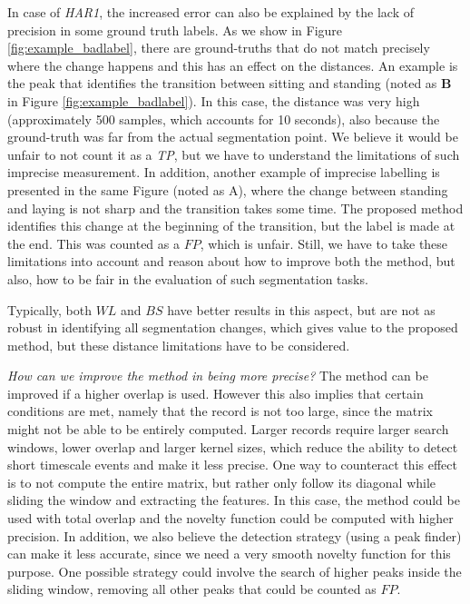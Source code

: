 In case of \textit{HAR1}, the increased error can also be explained by the lack of precision in some ground truth labels. As we show in Figure \ref{fig:example_badlabel}, there are ground-truths that do not match precisely where the change happens and this has an effect on the distances. An example is the peak that identifies the transition between sitting and standing (noted as \textbf{B} in Figure \ref{fig:example_badlabel}). In this case, the distance was very high (approximately 500 samples, which accounts for 10 seconds), also because the ground-truth was far from the actual segmentation point. We believe it would be unfair to not count it as a \textit{TP}, but we have to understand the limitations of such imprecise measurement. In addition, another example of imprecise labelling is presented in the same Figure (noted as A), where the change between standing and laying is not sharp and the transition takes some time. The proposed method identifies this change at the beginning of the transition, but the label is made at the end. This was counted as a $FP$, which is unfair. Still, we have to take these limitations into account and reason about how to improve both the method, but also, how to be fair in the evaluation of such segmentation tasks.

Typically, both $WL$ and $BS$ have better results in this aspect, but are not as robust in identifying all segmentation changes, which gives value to the proposed method, but these distance limitations have to be considered. 

\textit{How can we improve the method in being more precise?} The method can be improved if a higher overlap is used. However this also implies that certain conditions are met, namely that the record is not too large, since the matrix might not be able to be entirely computed. Larger records require larger search windows, lower overlap and larger kernel sizes, which reduce the ability to detect short timescale events and make it less precise. One way to counteract this effect is to not compute the entire matrix, but rather only follow its diagonal while sliding the window and extracting the features. In this case, the method could be used with total overlap and the novelty function could be computed with higher precision. In addition, we also believe the detection strategy (using a peak finder) can make it less accurate, since we need a very smooth novelty function for this purpose. One possible strategy could involve the search of higher peaks inside the sliding window, removing all other peaks that could be counted as $FP$.

